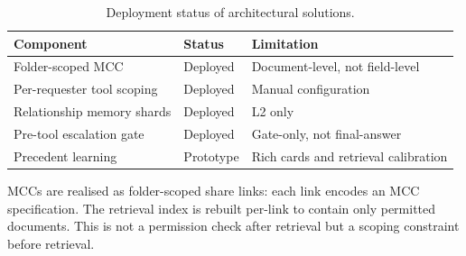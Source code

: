 \begin{table}[h]
  \caption{Deployment status of architectural solutions.}
  \label{tab:deployment_status}
  \centering
  \small
  \begin{tabular}{lll}
    \toprule
    \textbf{Component} & \textbf{Status} & \textbf{Limitation} \\
    \midrule
    Folder-scoped MCC & Deployed & Document-level, not field-level \\
    Per-requester tool scoping & Deployed & Manual configuration \\
    Relationship memory shards & Deployed & L2 only \\
    Pre-tool escalation gate & Deployed & Gate-only, not final-answer \\
    Precedent learning & Prototype & Rich cards and retrieval calibration \\
    \bottomrule
  \end{tabular}
\end{table}

MCCs are realised as folder-scoped share links: each link encodes an MCC specification. The retrieval index is rebuilt per-link to contain only permitted documents. This is not a permission check after retrieval but a scoping constraint before retrieval.
